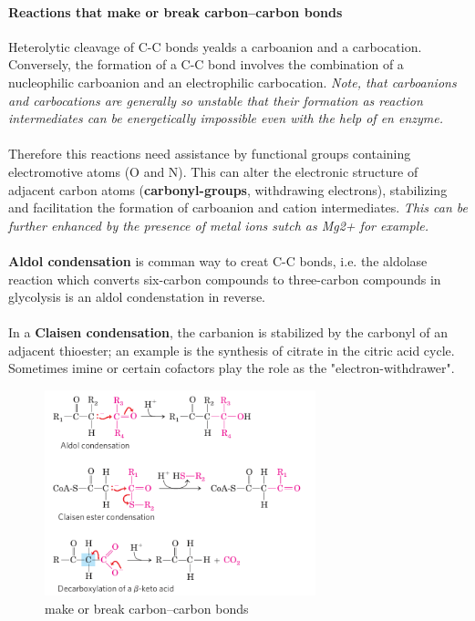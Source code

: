 \documentclass[../main.tex]{subfiles}
\begin{document}
\paragraph{Reactions that make or break carbon–carbon bonds}
Heterolytic cleavage of C-C bonds yealds a carboanion and a carbocation. Conversely, the formation of a C-C bond involves the combination of a nucleophilic carboanion and an electrophilic carbocation. \textit{Note, that carboanions and carbocations are generally so unstable that their formation as reaction intermediates can be energetically impossible even with the help of en enzyme. } \\
\\
Therefore this reactions need assistance by functional groups containing electromotive atoms (O and N). This can alter the electronic structure of adjacent carbon atoms (\textbf{carbonyl-groups}, withdrawing electrons), stabilizing and facilitation the formation of carboanion and cation intermediates. \textit{This can be further enhanced by the presence of metal ions sutch as Mg2+ for example. }\\
\\
\textbf{Aldol condensation} is comman way to creat C-C bonds, i.e. the aldolase reaction which converts six-carbon compounds to three-carbon compounds in glycolysis is an aldol condenstation in reverse. \\
\\
In a \textbf{Claisen condensation}, the carbanion is stabilized by the carbonyl of an adjacent thioester; an example is the synthesis of citrate in the citric acid cycle. Sometimes imine or certain cofactors play the role as the "electron-withdrawer". 

\begin{figure}[H]
	\centering
	\includegraphics[width=0.7\textwidth]{build carbons}
	\caption{make or break carbon–carbon bonds}
\end{figure}
\end{document}
